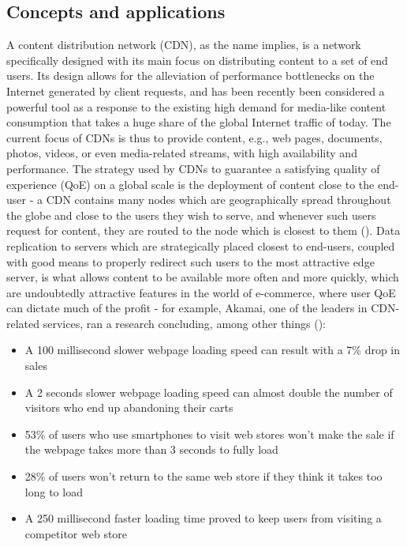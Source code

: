 \documentclass[
  oneside,
  11pt, a4paper,
  footinclude=true,
  headinclude=true,
  cleardoublepage=empty
]{scrbook}
\begin{document}
	\subsection{Concepts and applications}
	A content distribution network (CDN), as the name implies, is a network specifically designed with its  main focus on distributing content to a set of end users. Its design allows for the alleviation of performance bottlenecks on the Internet generated by client requests, and has been recently been considered a powerful tool as a response to the existing high demand for media-like content consumption that takes a huge share of the global Internet traffic of today. The current focus of CDNs is thus to provide content, e.g., web pages, documents, photos, videos, or even media-related streams, with high availability and performance. The strategy used by CDNs to guarantee a satisfying quality of experience (QoE) on a global scale is the deployment of content close to the end-user - a CDN contains many nodes which are geographically spread throughout the globe and close to the users they wish to serve, and whenever such users request for content, they are routed to the node which is closest to them (\cite{cookbook}). Data replication to servers which are strategically placed closest to end-users, coupled with good means to properly redirect such users to the most attractive edge server, is what allows content to be available more often and more quickly, which are undoubtedly attractive features in the world of e-commerce, where user QoE can dictate much of the profit - for example, Akamai, one of the leaders in CDN-related services, ran a research concluding, among other things (\cite{akamai}):
	
	\begin{itemize}
	    \item A 100 millisecond slower webpage loading speed can result with a 7\% drop in sales
        \item A 2 seconds slower webpage loading speed can almost double the number of visitors who end up abandoning their carts
        \item 53\% of users who use smartphones to visit web stores won’t make the sale if the webpage takes more than 3 seconds to fully load
        \item 28\% of users won’t return to the same web store if they think it takes too long to load
        \item A 250 millisecond faster loading time proved to keep users from visiting a competitor web store
	\end{itemize}{}
	
\end{document}
